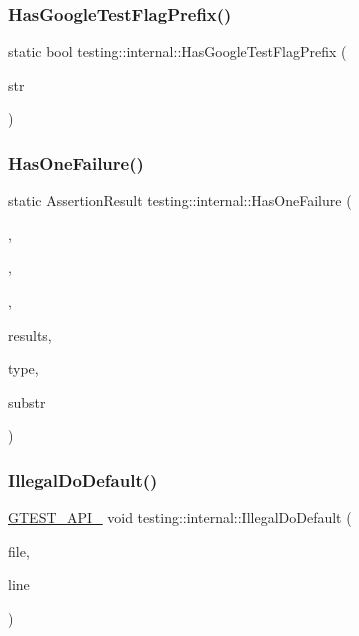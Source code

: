 \subsubsection{\texorpdfstring{HasGoogleTestFlagPrefix()}{HasGoogleTestFlagPrefix()}}
{\footnotesize\ttfamily static bool testing\+::internal\+::\+Has\+Google\+Test\+Flag\+Prefix (\begin{DoxyParamCaption}\item[{const char $\ast$}]{str }\end{DoxyParamCaption})\hspace{0.3cm}{\ttfamily [static]}}

\mbox{\label{namespacetesting_1_1internal_a4b5402183b934804ccaf61a4708f8e62}} 
\subsubsection{\texorpdfstring{HasOneFailure()}{HasOneFailure()}}
{\footnotesize\ttfamily static Assertion\+Result testing\+::internal\+::\+Has\+One\+Failure (\begin{DoxyParamCaption}\item[{const char $\ast$}]{,  }\item[{const char $\ast$}]{,  }\item[{const char $\ast$}]{,  }\item[{const Test\+Part\+Result\+Array \&}]{results,  }\item[{Test\+Part\+Result\+::\+Type}]{type,  }\item[{const std\+::string \&}]{substr }\end{DoxyParamCaption})\hspace{0.3cm}{\ttfamily [static]}}

\mbox{\label{namespacetesting_1_1internal_aa67e1e9d28122eedffbb7b6636824f2d}} 
\subsubsection{\texorpdfstring{IllegalDoDefault()}{IllegalDoDefault()}}
{\footnotesize\ttfamily \mbox{\hyperlink{gtest-port_8h_aa73be6f0ba4a7456180a94904ce17790}{G\+T\+E\+S\+T\+\_\+\+A\+P\+I\+\_\+}} void testing\+::internal\+::\+Illegal\+Do\+Default (\begin{DoxyParamCaption}\item[{const char $\ast$}]{file,  }\item[{int}]{line }\end{DoxyParamCaption})}


